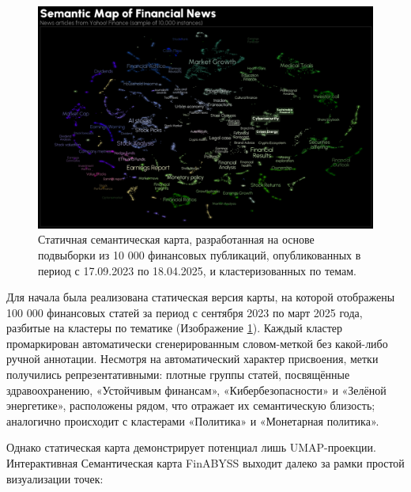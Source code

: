 \begin{figure}[H]
    \centering
    \includegraphics[width=1\linewidth]{img/semantic_map.png}
    \caption{Статичная семантическая карта, разработанная на основе подвыборки из 10 000 финансовых публикаций,
    опубликованных в период с 17.09.2023 по 18.04.2025, и кластеризованных по темам.}
    \label{fig:semantic_map}
\end{figure}

Для начала была реализована статическая версия карты, на которой отображены 100 000 финансовых статей за период
с сентября 2023 по март 2025 года, разбитые на кластеры по тематике (Изображение \ref{fig:semantic_map}).
Каждый кластер промаркирован автоматически сгенерированным словом-меткой без какой-либо ручной аннотации.
Несмотря на автоматический характер присвоения, метки получились репрезентативными: плотные группы статей,
посвящённые здравоохранению, «Устойчивым финансам», «Кибербезопасности» и «Зелёной энергетике», расположены
рядом, что отражает их семантическую близость; аналогично происходит с кластерами «Политика» и «Монетарная политика».

Однако статическая карта демонстрирует потенциал лишь UMAP-проекции. Интерактивная Семантическая
карта FinABYSS выходит далеко за рамки простой визуализации точек:

